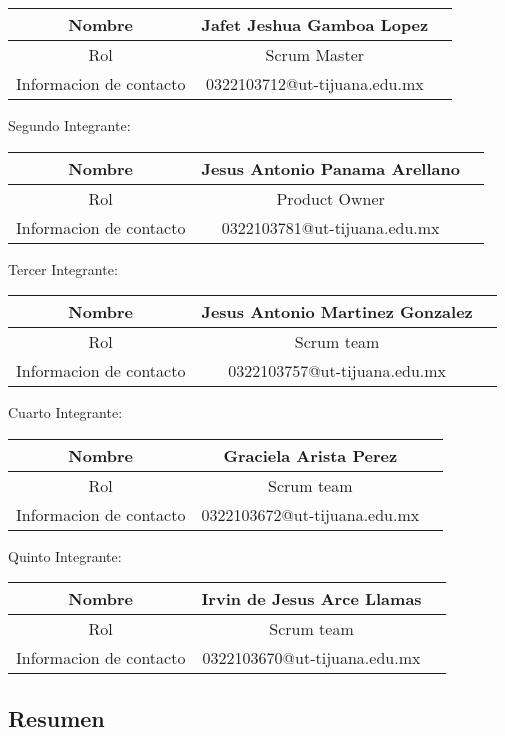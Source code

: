 \documentclass[12pt,a4paper, twosite]{article}
\begin{document}
\begin{tabular}{|c|c|c|}
  \hline
  Nombre & Jafet Jeshua Gamboa Lopez \\
  \hline
  Rol &  Scrum Master\\
  \hline
  Informacion de contacto & 0322103712@ut-tijuana.edu.mx \\
  \hline
\end{tabular}

Segundo Integrante:

\begin{tabular}{|c|c|c|}
  \hline
  Nombre & Jesus Antonio Panama Arellano  \\
  \hline
  Rol & Product Owner \\
  \hline
  Informacion de contacto & 0322103781@ut-tijuana.edu.mx \\
  \hline
\end{tabular}

Tercer Integrante:

\begin{tabular}{|c|c|c|}
  \hline
  Nombre & Jesus Antonio Martinez Gonzalez  \\
  \hline
  Rol & Scrum team \\
  \hline
  Informacion de contacto & 0322103757@ut-tijuana.edu.mx \\
  \hline
\end{tabular}

Cuarto Integrante:

\begin{tabular}{|c|c|c|}
  \hline
  Nombre & Graciela Arista Perez \\
  \hline
  Rol & Scrum team \\
  \hline
  Informacion de contacto & 0322103672@ut-tijuana.edu.mx \\
  \hline
\end{tabular}

Quinto Integrante:

\begin{tabular}{|c|c|c|}
  \hline
  Nombre & Irvin de Jesus Arce Llamas  \\
  \hline
  Rol & Scrum team \\
  \hline
  Informacion de contacto & 0322103670@ut-tijuana.edu.mx \\
  \hline
\end{tabular}


\subsection{Resumen}
\label{sec:orgdaca22c}
\end{document}
